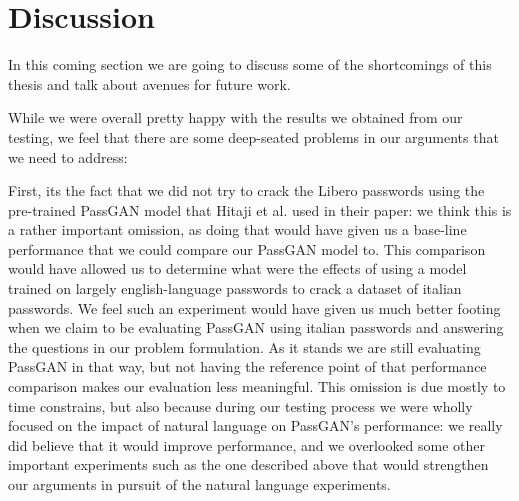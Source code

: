 \section{Discussion}\label{sec:discussion}

In this coming section we are going to discuss some of the shortcomings of this thesis and talk about avenues for future work.

While we were overall pretty happy with the results we obtained from our testing, we feel that there are some deep-seated problems in our arguments that we need to address:

First, its the fact that we did not try to crack the Libero passwords using the pre-trained PassGAN model that Hitaji et al. \cite{PassGAN} used in their paper: we think this is a rather important omission, as doing that would have given us a base-line performance that we could compare our PassGAN model to.  This comparison would have allowed us to determine what were the effects of using a model trained on largely english-language passwords to crack a dataset of italian passwords. We feel such an experiment would have given us much better footing when we claim to be evaluating PassGAN using italian passwords and answering the questions in our problem formulation. As it stands we are still evaluating PassGAN in that way, but not having the reference point of that performance comparison makes our evaluation less meaningful.
This omission is due mostly to time constrains, but also because during our testing process we were wholly focused on the impact of natural language on PassGAN's performance: we really did believe that it would improve performance, and we overlooked some other important experiments such as the one described above that would strengthen our arguments in pursuit of the natural language experiments. 

